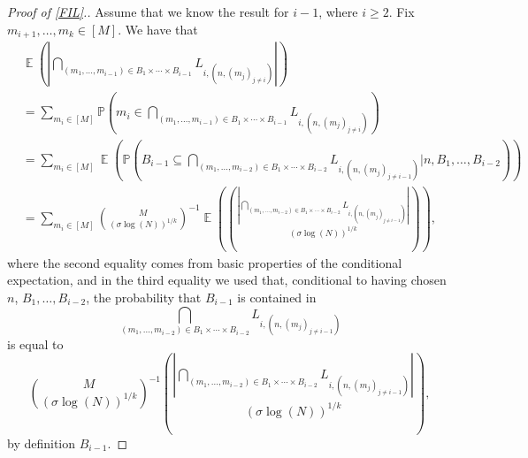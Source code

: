 \documentclass[letter, 11pt]{article}
\theoremstyle{plain} %
\theoremstyle{definition} %
\theoremstyle{plain}
\theoremstyle{plain}
\renewcommand{\P}{\mathbb{P}}
\newcommand{\1}{\mathbbm{1}}
\newcommand{\E}{\operatorname{\mathbb{E}}}
\begin{document}
\begin{proof}[Proof of \cref{FIL}.]
    Assume that we know the result for $i-1$, where $i\geq 2$. Fix $m_{i+1},\ldots,m_k\in [M]$. We have that
    \begin{align*}
        &\E\left( \left| \bigcap_{(m_1,\ldots,m_{i-1})\in  B_1\times \cdots \times B_{i-1} } L_{i,(n,(m_j)_{j\neq i })} \right| \right) \\
        & = \sum_{m_i\in [M]} \P\left(m_i \in \bigcap_{(m_1,\ldots,m_{i-1})\in  B_1\times \cdots \times B_{i-1} } L_{i,(n,(m_j)_{j\neq i })}\right)\\
        & =\sum_{m_i\in [M]} \E\left(\P\left(B_{i-1}\subseteq  \bigcap_{(m_1,\ldots,m_{i-2})\in  B_1\times \cdots \times B_{i-2} } L_{i,(n,(m_j)_{j\neq i-1 })}\Bigg| n,B_1,\ldots,B_{i-2} \right) \right)\\
        & =\sum_{m_i\in [M]} \binom{M}{(\sigma \log(N))^{1/k}}^{-1}\E\left( \binom{\left| \bigcap_{(m_1,\ldots,m_{i-2})\in  B_1\times \cdots \times B_{i-2} } L_{i,(n,(m_j)_{j\neq i-1 })} \right|}{(\sigma \log(N))^{1/k}}   \right),
    \end{align*}
where the second equality comes from basic properties of the conditional expectation, and in the third equality we used that, conditional to having chosen $n$, $B_1,\ldots,B_{i-2}$, the probability that $B_{i-1}$ is contained in
$$ \bigcap_{(m_1,\ldots,m_{i-2})\in  B_1\times \cdots \times B_{i-2} } L_{i,(n,(m_j)_{j\neq i-1 })} $$
is equal to    
$$\binom{M}{(\sigma \log(N))^{1/k}}^{-1} \binom{\left| \bigcap_{(m_1,\ldots,m_{i-2})\in  B_1\times \cdots \times B_{i-2} } L_{i,(n,(m_j)_{j\neq i-1 })} \right|}{(\sigma \log(N))^{1/k}} , $$
by definition $B_{i-1}$. 


\end{proof}
\end{document}
